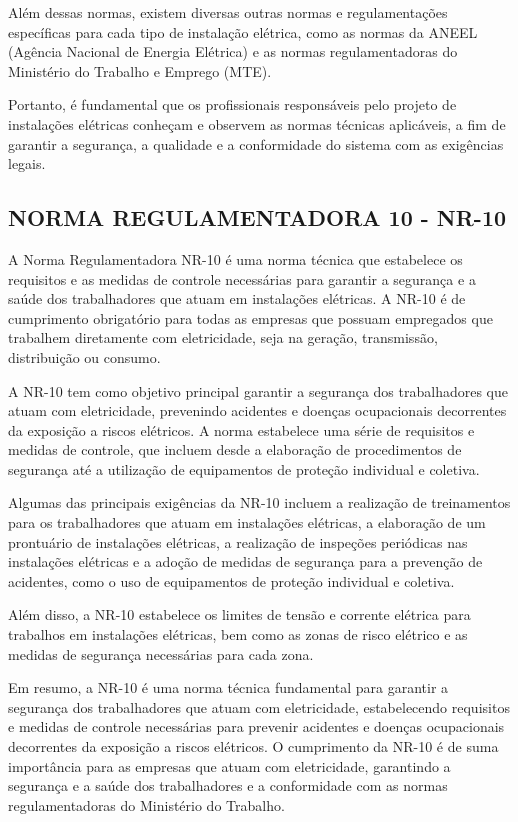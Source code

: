 Além dessas normas, existem diversas outras normas e regulamentações específicas para cada tipo de instalação elétrica, como as normas da ANEEL (Agência Nacional de Energia Elétrica) e as normas regulamentadoras do Ministério do Trabalho e Emprego (MTE).

Portanto, é fundamental que os profissionais responsáveis pelo projeto de instalações elétricas conheçam e observem as normas técnicas aplicáveis, a fim de garantir a segurança, a qualidade e a conformidade do sistema com as exigências legais.

\subsection{NORMA REGULAMENTADORA 10 - NR-10}

A Norma Regulamentadora NR-10 é uma norma técnica que estabelece os requisitos e as medidas de controle necessárias para garantir a segurança e a saúde dos trabalhadores que atuam em instalações elétricas. A NR-10 é de cumprimento obrigatório para todas as empresas que possuam empregados que trabalhem diretamente com eletricidade, seja na geração, transmissão, distribuição ou consumo.

A NR-10 tem como objetivo principal garantir a segurança dos trabalhadores que atuam com eletricidade, prevenindo acidentes e doenças ocupacionais decorrentes da exposição a riscos elétricos. A norma estabelece uma série de requisitos e medidas de controle, que incluem desde a elaboração de procedimentos de segurança até a utilização de equipamentos de proteção individual e coletiva.

Algumas das principais exigências da NR-10 incluem a realização de treinamentos para os trabalhadores que atuam em instalações elétricas, a elaboração de um prontuário de instalações elétricas, a realização de inspeções periódicas nas instalações elétricas e a adoção de medidas de segurança para a prevenção de acidentes, como o uso de equipamentos de proteção individual e coletiva.

Além disso, a NR-10 estabelece os limites de tensão e corrente elétrica para trabalhos em instalações elétricas, bem como as zonas de risco elétrico e as medidas de segurança necessárias para cada zona.

Em resumo, a NR-10 é uma norma técnica fundamental para garantir a segurança dos trabalhadores que atuam com eletricidade, estabelecendo requisitos e medidas de controle necessárias para prevenir acidentes e doenças ocupacionais decorrentes da exposição a riscos elétricos. O cumprimento da NR-10 é de suma importância para as empresas que atuam com eletricidade, garantindo a segurança e a saúde dos trabalhadores e a conformidade com as normas regulamentadoras do Ministério do Trabalho.

